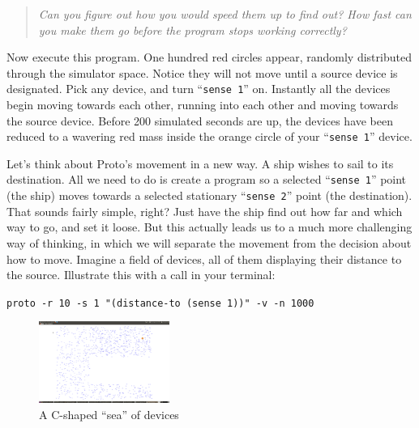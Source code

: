\documentclass{article}
\newcommand\code[1]{\begin{center}\var{#1}\end{center}}
\newcommand\problem[1]{\begin{quote}{\em #1}\end{quote}}
\newcommand\var[1]{{\tt #1}}
\newcommand\qvar[1]{``{\tt #1}''}
\begin{document}
\problem{Can you figure out how you would speed them up to find out?
  How fast can you make them go before the program stops working
  correctly?}

Now execute this program.  One hundred red circles appear, randomly
distributed through the simulator space.  Notice they will not move
until a source device is designated.  Pick
any device, and turn \qvar{sense 1} on.  Instantly all the devices
begin moving towards each other, running into each other and moving
towards the source device.  Before 200 simulated seconds are up, the
devices have been reduced to a wavering red mass inside the orange
circle of your \qvar{sense 1} device.

Let's think about Proto's movement in a new way.  A ship wishes to
sail to its destination.  All we need to do is create a program so a
selected \qvar{sense 1} point (the ship) moves towards a selected
stationary \qvar{sense 2} point (the destination).  That sounds fairly
simple, right?  Just have the ship find out how far and which way to
go, and set it loose.  But this actually leads us to a much more
challenging way of thinking, in which we will separate the movement
from the decision about how to move.  Imagine a field of devices, all
of them displaying their distance to the source.  Illustrate this with
a call in your terminal:

\code{proto -r 10 -s 1 "(distance-to (sense 1))" -v -n 1000}

\begin{figure}
  \includegraphics[width=0.38\textwidth]{figures/c-sea.png}
  \caption{A C-shaped ``sea'' of devices}
  \vspace{-0.5cm}
  \label{f:csea}
\end{figure}
\end{document}

